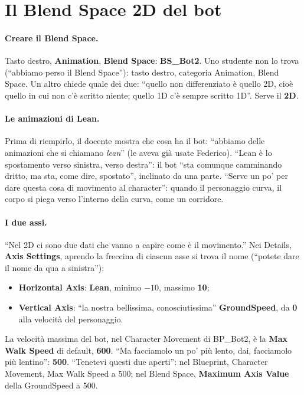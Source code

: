 \section{Il Blend Space 2D del bot}
\label{ue10:sec:blend}

\paragraph{Creare il Blend Space.} Tasto destro, \textbf{Animation}, \textbf{Blend Space}:
\textbf{BS\_Bot2}. Uno studente non lo trova (``abbiamo perso il Blend Space''): tasto
destro, categoria Animation, Blend Space. Un altro chiede quale dei due: ``quello non
differenziato è quello 2D, cioè quello in cui non c'è scritto niente; quello 1D c'è
sempre scritto 1D''. Serve il \textbf{2D}.

\paragraph{Le animazioni di Lean.} Prima di riempirlo, il docente mostra che cosa ha il
bot: ``abbiamo delle animazioni che si chiamano \emph{lean}'' (le aveva già usate
Federico). ``Lean è lo spostamento verso sinistra, verso destra'': il bot ``sta comunque
camminando dritto, ma sta, come dire, spostato'', inclinato da una parte. ``Serve un po'
per dare questa cosa di movimento al character'': quando il personaggio curva, il corpo si
piega verso l'interno della curva, come un corridore.

\paragraph{I due assi.} ``Nel 2D ci sono due dati che vanno a capire come è il
movimento.'' Nei Details, \textbf{Axis Settings}, aprendo la freccina di ciascun asse si
trova il nome (``potete dare il nome da qua a sinistra''):
\begin{itemize}
  \item \textbf{Horizontal Axis}: \textbf{Lean}, minimo \textbf{$-10$}, massimo
        \textbf{10};
  \item \textbf{Vertical Axis}: ``la nostra bellissima, conosciutissima''
        \textbf{GroundSpeed}, da \textbf{0} alla velocità del personaggio.
\end{itemize}
La velocità massima del bot, nel Character Movement di BP\_Bot2, è la \textbf{Max Walk
Speed} di default, \textbf{600}. ``Ma facciamolo un po' più lento, dai, facciamolo più
lentino'': \textbf{500}. ``Tenetevi questi due aperti'': nel Blueprint, Character
Movement, Max Walk Speed a 500; nel Blend Space, \textbf{Maximum Axis Value} della
GroundSpeed a 500.

